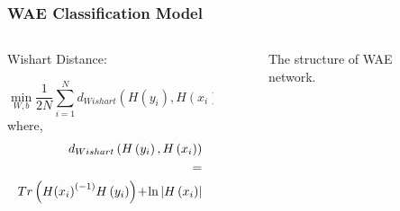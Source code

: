 \documentclass[10pt]{beamer}
\begin{document}
\begin{frame}
\frametitle{WAE Classification Model}
\begin{columns}
\begin{column}{0.5\textwidth}

Wishart Distance:

\begin{equation}
\min \limits _{W,b} \frac {1}{2N}\sum \limits _{i = 1}^{N} {{d_{Wishart}}\left ({ {H\left ({ {y_{i}} }\right ),H\left ({ {x_{i}} }\right )} }\right )}
\end{equation}
where,
\begin{equation} 
\begin{split}
{d_{Wishart}}\left ({ {H\left ({ {y_{i}} }\right ),H\left ({ {x_{i}} }\right )} }\right ) \\ = \\Tr\left ({ {H{{\left ({ {x_{i}} }\right )}^{( - 1)}}H\left ({ {y_{i}} }\right )} }\right ) \!+\! \ln \left |{ {H\left ({ {x_{i}} }\right )} }\right | \notag
\end{split}
\end{equation}
\end{column}

\begin{column}{0.5\textwidth}
\begin{figure}
\centering
{}
\caption{The structure of WAE network.}
\label{fig:one}
\end{figure}
\end{column}
\end{columns}
\end{frame}
\end{document}
